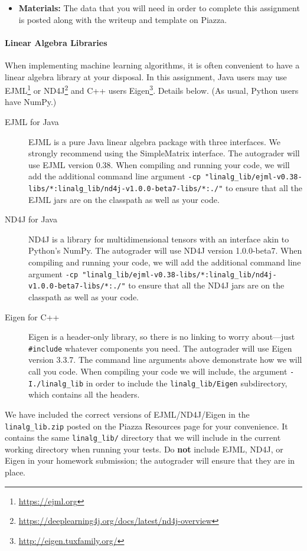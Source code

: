 \documentclass[11pt,addpoints,answers]{exam}
\begin{document}
\begin{itemize}
\begin{itemize}
  \end{itemize}
  
\item\textbf{Materials:} The data that you will need in order to complete this assignment is posted along with the writeup and template on Piazza.

\end{itemize}


\begin{notebox}
\paragraph{Linear Algebra Libraries} When implementing machine learning algorithms, it is often convenient to have a linear algebra library at your disposal. In this assignment, Java users may use EJML\footnote{\url{https://ejml.org}} or ND4J\footnote{\url{https://deeplearning4j.org/docs/latest/nd4j-overview}} and C++ users Eigen\footnote{\url{http://eigen.tuxfamily.org/}}. Details below. 
%
(As usual, Python users have NumPy.)
%
\begin{description}
\item[EJML for Java] EJML is a pure Java linear algebra package with three interfaces. We strongly recommend using the SimpleMatrix interface. The autograder will use EJML version 0.38. When compiling and running your code, we will add the additional command line argument \small{\lstinline{-cp "linalg_lib/ejml-v0.38-libs/*:linalg_lib/nd4j-v1.0.0-beta7-libs/*:./"}}
to ensure that all the EJML jars are on the classpath as well as your code. 

\item[ND4J for Java] ND4J is a library for multidimensional tensors with an interface akin to Python's NumPy. The autograder will use ND4J version 1.0.0-beta7. When compiling and running your code, we will add the additional command line argument \small{\lstinline{-cp "linalg_lib/ejml-v0.38-libs/*:linalg_lib/nd4j-v1.0.0-beta7-libs/*:./"}} to ensure that all the ND4J jars are on the classpath as well as your code. 

\item[Eigen for C++] Eigen is a header-only library, so there is no linking to worry about---just \lstinline{#include} whatever components you need. The autograder will use Eigen version 3.3.7. The command line arguments above demonstrate how we will call you code. When compiling your code we will include, the argument \lstinline{-I./linalg_lib} in order to include the \lstinline{linalg_lib/Eigen} subdirectory, which contains all the headers.

\end{description} 
We have included the correct versions of EJML/ND4J/Eigen in the \lstinline{linalg_lib.zip} posted on the Piazza Resources page for your convenience. It contains the same \lstinline{linalg_lib/} directory that we will include in the current working directory when running your tests. Do {\bf not} include EJML, ND4J, or Eigen in your homework submission; the autograder will ensure that they are in place. 
\end{notebox}\clearpage
\end{document}
